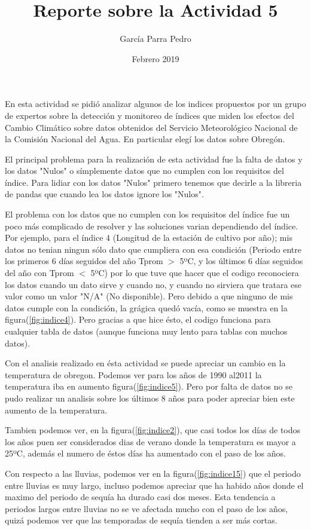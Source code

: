 \documentclass[12pt]{article}
\title{Reporte sobre la Actividad 5}
\author{García Parra Pedro}
\date{Febrero 2019}
\begin{document}
\maketitle

En esta actividad se pidió analizar algunos de los indices propuestos por un grupo de expertos sobre la detección y monitoreo de índices que miden los efectos del Cambio Climático sobre datos obtenidos del Servicio Meteorológico Nacional de la Comisión Nacional del Agua. En particular elegí los datos sobre Obregón. 

El principal problema para la realización de esta actividad fue la falta de datos y los datos "Nulos" o símplemente datos que no cumplen con los requisitos del índice.
Para lidiar con los datos "Nulos" primero tenemos que decirle a la libreria de pandas que cuando lea los datos ignore los "Nulos".

El problema con los datos que no cumplen con los requisitos del índice fue un poco más complicado de resolver y las soluciones varian dependiendo del índice.
Por ejemplo, para el índice 4 (Longitud de la estación de cultivo por año); mis datos no tenian ningun sólo dato que cumpliera con esa condición (Periodo entre los primeros 6 días seguidos del año  Tprom $>$ 5ºC, y los últimos 6 días seguidos del año con Tprom $<$ 5ºC) por lo que tuve que hacer que el codigo reconociera los datos cuando un dato sirve y cuando no, y cuando no sirviera que tratara ese valor como un valor "N/A" (No disponible). Pero debido a que ninguno de mis datos cumple con la condición, la grágica quedó vacía, como se muestra en la figura(\ref{fig:indice4}). Pero gracias a que hice ésto, el codigo funciona para cualquier tabla de datos (aunque funciona muy lento para tablas con muchos datos).

Con el analisis realizado en ésta actividad se puede apreciar un cambio en la temperatura de obregon. Podemos ver para los años de 1990 al2011 la temperatura iba en aumento figura(\ref{fig:indice5}). Pero por falta de datos no se pudo realizar un analisis sobre los últimos 8 años para poder apreciar bien este aumento de la temperatura.

 Tambien podemos ver, en la figura(\ref{fig:indice2}), que casi todos los días de todos los años puen ser considerados dias de verano donde la temperatura es mayor a 25ºC, además el numero de éstos días ha aumentado con el paso de los años.
 
 Con respecto a las lluvias, podemos ver en la figura(\ref{fig:indice15}) que el periodo entre lluvias es muy largo, incluso podemos apreciar que ha habido años donde el maximo del periodo de sequía ha durado casi dos meses. Esta tendencia a periodos largos entre lluvias no se ve afectada mucho con el paso de los años, quizá podemos ver que las temporadas de sequía tienden a ser más cortas.
 
\end{document}

